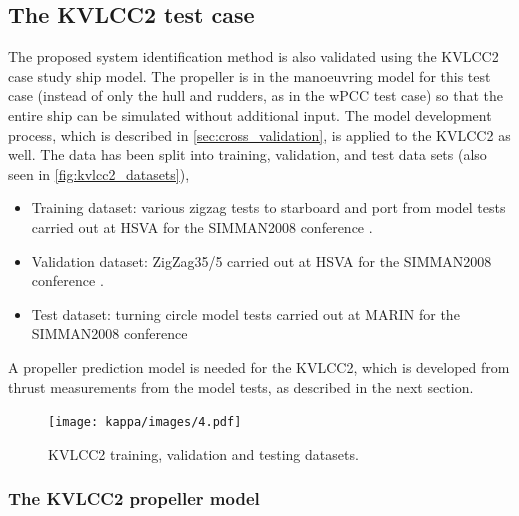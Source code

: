 \subsection{The KVLCC2 test case}
\label{\detokenize{05.01_case_studies:the-kvlcc2-test-scenarios}}
The proposed system identification method is also validated using the KVLCC2 case study ship model.
The propeller is in the manoeuvring model for this test case (instead of only the hull and rudders, as in the wPCC test case) so that the entire ship can be simulated without additional input.
The model development process, which is described in \autoref{sec:cross_validation}, is applied to the KVLCC2 as well.
The data has been split into training, validation, and test data sets (also seen in \autoref{fig:kvlcc2_datasets}),
\vspace{5pt}
\begin{itemize}
    \setlength\itemsep{5pt}
    \item Training dataset: various zigzag tests to starboard and port from model tests carried out at HSVA for the SIMMAN2008 conference \cite{sternExperienceSIMMAN20082011}.
    \item Validation dataset: ZigZag35/5 carried out at HSVA for the SIMMAN2008 conference \cite{sternExperienceSIMMAN20082011}.
    \item Test dataset: turning circle model tests carried out at MARIN for the SIMMAN2008 conference \cite{sternExperienceSIMMAN20082011}
\end{itemize}
\vspace{5pt}
\noindent A propeller prediction model is needed for the KVLCC2, which is developed from thrust measurements from the model tests, as described in the next section.
\begin{figure}[h!]
\centering
\texttt{[image: kappa/images/4.pdf]}
\caption{KVLCC2 training, validation and testing datasets.}\label{fig:kvlcc2_datasets}\end{figure}
\subsubsection{The KVLCC2 propeller model}
\label{\detokenize{06.20_results_kvlcc2:the-kvlcc2-propeller-model}}\label{\detokenize{06.20_results_kvlcc2:results-propeller-model}}

